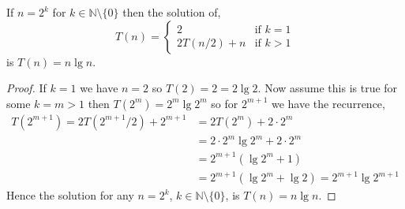 \begin{proposition}
	\label{prop:power-2-recurrence}
	If $n=2^{k}$ for $k\in\mathbb{N}\setminus\{0\}$ then the solution of,
	\begin{equation*}
		T(n) =
		\begin{cases}
			2 &\text{if }k=1\\
			2T(n/2) + n &\text{if }k>1
		\end{cases}
	\end{equation*}
	is $T(n)=n\lg n$.
\end{proposition}

\begin{proof}
	If $k=1$ we have $n=2$ so $T(2) = 2 = 2\lg 2$. Now assume this is true for some $k=m>1$ then $T(2^{m}) = 2^{m}\lg 2^{m}$ so for $2^{m+1}$ we have the recurrence,
	\begin{equation*}
		\begin{aligned}
			T(2^{m+1}) = 2T(2^{m+1}/2) + 2^{m+1} &= 2T(2^{m}) + 2\cdot2^{m}\\
			&= 2\cdot2^{m}\lg 2^{m} + 2\cdot 2^{m}\\
			&= 2^{m+1}\left(\lg 2^{m} + 1\right)\\
			&= 2^{m+1}\left(\lg 2^{m} + \lg 2\right) = 2^{m+1}\lg 2^{m+1}
		\end{aligned}
	\end{equation*}
	Hence the solution for any $n=2^{k}$, $k\in\mathbb{N}\setminus\{0\}$, is $T(n)=n\lg n$.
\end{proof}

